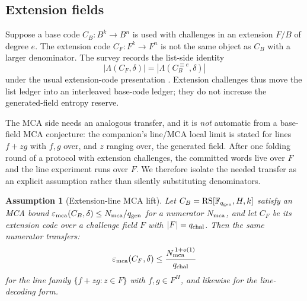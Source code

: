\documentclass[11pt]{article}
\newtheorem{assumption}[theorem]{Assumption}
\theoremstyle{definition}
\newcommand{\F}{\mathbb F}
\newcommand{\RS}{\operatorname{RS}}
\newcommand{\mca}{\varepsilon_{\rm mca}}
\newcommand{\qgen}{q_{\rm gen}}
\newcommand{\qchal}{q_{\rm chal}}
\newcommand{\Int}[2]{#1^{\equiv #2}}
\begin{document}
\subsection{Extension fields}
\label{sec:extension}

Suppose a base code $C_B:B^k\to B^n$ is used with challenges in an extension $F/B$ of degree $e$.  The extension code $C_F:F^k\to F^n$ is not the same object as $C_B$ with a larger denominator.  The survey records the list-side identity
\begin{equation}
\label{eq:extension-list}
        |\Lambda(C_F,\delta)|=|\Lambda(\Int{C_B}{e},\delta)|
\end{equation}
under the usual extension-code presentation \cite{ABF26}.  Extension challenges thus move the list ledger into an interleaved base-code ledger; they do not increase the generated-field entropy reserve.

The MCA side needs an analogous transfer, and it is \emph{not} automatic from a base-field MCA conjecture: the companion's line/MCA local limit is stated for lines $f+zg$ with $f,g$ over, and $z$ ranging over, the generated field.  After one folding round of a protocol with extension challenges, the committed words live over $F$ and the line experiment runs over $F$.  We therefore isolate the needed transfer as an explicit assumption rather than silently substituting denominators.

\begin{assumption}[Extension-line MCA lift]
\label{ass:extension-mca-lift}
Let $C_B=\RS[\F_{\qgen},H,k]$ satisfy an MCA bound $\mca(C_B,\delta)\le N_{\rm mca}/\qgen$ for a numerator $N_{\rm mca}$, and let $C_F$ be its extension code over a challenge field $F$ with $|F|=\qchal$.  Then the same numerator transfers:
\[
        \mca(C_F,\delta)\le \frac{N_{\rm mca}^{\,1+o(1)}}{\qchal}
\]
for the line family $\{f+zg:z\in F\}$ with $f,g\in F^H$, and likewise for the line-decoding form.
\end{assumption}
\end{document}

